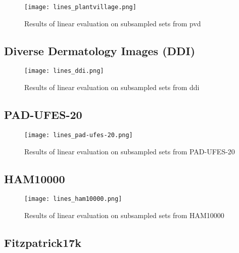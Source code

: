 \begin{figure}[H]
    \begin{center}
    \texttt{[image: lines\_plantvillage.png]}
    \caption{Results of linear evaluation on subsampled sets from \gls{pvd}}\label{fig:lines_plantvillage}
    \end{center}
\end{figure}

\subsection{Diverse Dermatology Images (DDI)}

\begin{figure}[H]
    \begin{center}
    \texttt{[image: lines\_ddi.png]}
    \caption{Results of linear evaluation on subsampled sets from \gls{ddi}}\label{fig:lines_ddi}
    \end{center}
\end{figure}

\subsection{PAD-UFES-20}

\begin{figure}[H]
    \begin{center}
    \texttt{[image: lines\_pad-ufes-20.png]}
    \caption{Results of linear evaluation on subsampled sets from PAD-UFES-20}\label{fig:lines_pad-ufes-20}
    \end{center}
\end{figure}

\subsection{HAM10000}

\begin{figure}[H]
    \begin{center}
    \texttt{[image: lines\_ham10000.png]}
    \caption{Results of linear evaluation on subsampled sets from HAM10000}\label{fig:lines_ham10000}
    \end{center}
\end{figure}

\subsection{Fitzpatrick17k}

